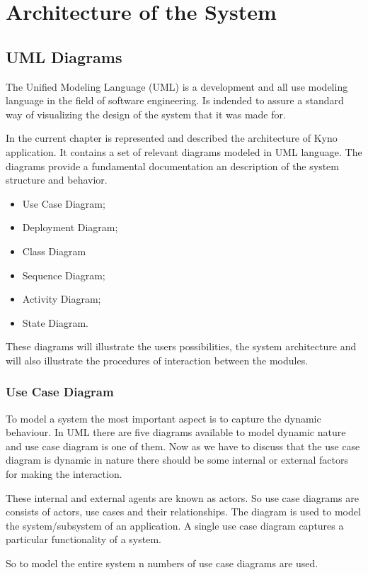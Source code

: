 \section{Architecture of the System}
\subsection{UML Diagrams}
The Unified Modeling Language (UML)\cite{uml} is a development and all use modeling language in the field of software engineering. Is indended to assure a standard way of visualizing the design of the system that it was made for.

In the current chapter is represented and described the architecture of Kyno application. It contains a set of relevant diagrams modeled in UML language. The diagrams provide a fundamental documentation an description of the system structure and behavior.

\begin{itemize}
\item Use Case Diagram;
\item Deployment Diagram;
\item Class Diagram
\item Sequence Diagram;
\item Activity Diagram;
\item State Diagram.

\end{itemize}
These diagrams will illustrate the users possibilities, the system architecture and will also illustrate the procedures of interaction between the modules.

\subsubsection{Use Case Diagram}
To model a system the most important aspect is to capture the dynamic behaviour. In UML there are five diagrams available to model dynamic nature and use case diagram is one of them. Now as we have to discuss that the use case diagram is dynamic in nature there should be some internal or external factors for making the interaction.

These internal and external agents are known as actors. So use case diagrams are consists of actors, use cases and their relationships. The diagram is used to model the system/subsystem of an application. A single use case diagram captures a particular functionality of a system.

So to model the entire system n numbers of use case diagrams are used.

